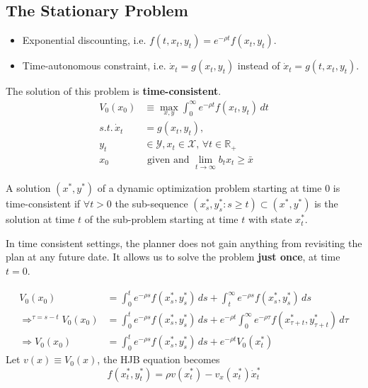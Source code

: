 \subsection{The Stationary Problem}

\begin{itemize}
    \item Exponential discounting, i.e. $f(t,x_t,y_t) = e^{-\rho t}f(x_t,y_t)$.
    \item Time-autonomous constraint, i.e. $\dot{x}_t = g(x_t,y_t)$ instead of $\dot{x}_t = g(t,x_t,y_t)$.
\end{itemize}
The solution of this problem is \textbf{time-consistent}.
\begin{align}
    V_0(x_0)          & \equiv \max_{x,y} \int_{0}^{\infty} e^{-\rho t} f(x_t,y_t) \, dt    \\
    s.t. \, \dot{x}_t & = g(x_t,y_t),                                                       \\
    y_t               & \in \mathcal{Y}, x_t \in \mathcal{X}, \, \forall t \in \mathbb{R}_+ \\
    x_0               & \text{ given and } \lim_{t \to \infty} b_tx_t \geq \bar{x}
\end{align}


\begin{definition}
    A solution $(x^*,y^*)$ of a dynamic optimization problem starting at time $0$ is time-consistent if $\forall t > 0$ the sub-sequence $(x_s^*,y_s^*: s \geq t) \subset (x^*,y^*)$ is the solution at time $t$ of the sub-problem starting at time $t$ with state $x_t^*$.
\end{definition}

In time consistent settings, the planner does not gain anything from revisiting the plan at any future date. It allows us to solve the problem \textbf{just once}, at time $t=0$.

\begin{remark*}
    \begin{align*}
        V_0(x_0)                                 & = \int_{0}^{t} e^{-\rho s} f(x_s^*,y_s^*) \, ds + \int_{t}^{\infty } e^{-\rho s} f(x_s^*,y_s^*) \, ds                                \\
        \Longrightarrow^{\tau = s - t}  V_0(x_0) & = \int_{0}^{t} e^{-\rho s} f(x_s^*,y_s^*) \, ds + e^{-\rho t}\int_{0}^{\infty } e^{-\rho \tau} f(x_{\tau+t}^*,y_{\tau+t}^*) \, d\tau \\
        \Longrightarrow  V_0(x_0)                & = \int_{0}^{t} e^{-\rho s} f(x_s^*,y_s^*) \, ds + e^{-\rho t}V_0(x_t^*)
    \end{align*}
    Let $v(x) \equiv V_0(x)$, the HJB equation becomes \[
        f(x_t^*,y_t^*) = \rho v(x_t^*) - v_x(x_t^*)\dot{x}_t^*
    \]
\end{remark*}

